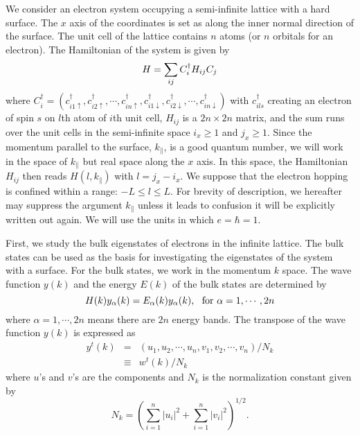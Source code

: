 \documentclass[aps,pra,amsmath,twocolumn,showpacs,bibnotes,10pt]{revtex4-1}
\begin{document}
We consider an electron system occupying a semi-infinite lattice with a hard surface. The $x$ axis of the coordinates is set as along the inner normal direction of the surface. The unit cell of the lattice contains $n$ atoms (or $n$ orbitals for an electron). The Hamiltonian of the system is given by
\begin{equation}
H= \sum_{ij}C^{\dagger}_{i}H_{ij}C_{j}\nonumber\\
\end{equation}
where $C^{\dagger}_{i} = (c^{\dagger}_{i1\uparrow},c^{\dagger}_{i2\uparrow},\cdots,c^{\dagger}_{in\uparrow},c^{\dagger}_{i1\downarrow},c^{\dagger}_{i2\downarrow},\cdots,c^{\dagger}_{in\downarrow})$ with $c^{\dagger}_{ils}$ creating an electron of spin $s$ on $l$th atom of $i$th unit cell, $H_{ij}$ is a $2n\times 2n$ matrix, and the sum runs over the unit cells in the semi-infinite space $i_x \ge 1$ and $j_x \ge 1$. Since the momentum parallel to the surface, $k_{\parallel}$, is a good quantum number, we will work in the space of $k_{\parallel}$ but real space along the $x$ axis. In this space, the Hamiltonian $H_{ij}$ then reads $H(l,k_{\parallel})$ with $l = j_x-i_x$. We suppose that the electron hopping is confined within a range: $-L \le l \le L$. For brevity of description, we hereafter may suppress the argument $k_{\parallel}$ unless it leads to confusion it will be explicitly written out again. We will use the units in which $e = \hbar = 1$.

First, we study the bulk eigenstates of electrons in the infinite lattice. The bulk states can be used as the basis for investigating the eigenstates of the system with a surface. For the bulk states, we work in the momentum $k$ space. The wave function $y(k)$ and the energy $E(k)$ of the bulk states are determined by
\begin{equation}
H(k)y_{\alpha}(k) = E_{\alpha}(k)y_{\alpha}(k), ~~{\rm for}~ \alpha= 1,\cdots,2n             \label{s1}
\end{equation}
where $\alpha = 1,\cdots,2n$ means there are $2n$ energy bands. The transpose of the wave function $y(k)$ is expressed as
\begin{eqnarray}
y^{t}(k) &=& (u_1,u_2,\cdots,u_n,v_1,v_2,\cdots,v_n)/N_k  \nonumber\\
&\equiv& w^t(k)/N_k \label{wv}
\end{eqnarray}
where $u$'s and $v$'s are the components and $N_k$ is the normalization constant given by
\begin{equation}
N_k = (\sum_{i=1}^n|u_i|^2+\sum_{i=1}^n|v_i|^2)^{1/2}. \nonumber
\end{equation}
\end{document}
